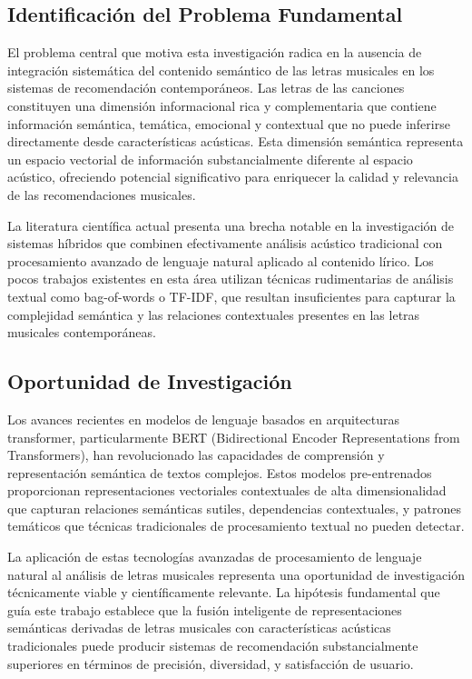 \documentclass[12pt,a4paper]{article}
\begin{document}
\subsection{Identificación del Problema Fundamental}

El problema central que motiva esta investigación radica en la ausencia de integración sistemática del contenido semántico de las letras musicales en los sistemas de recomendación contemporáneos. Las letras de las canciones constituyen una dimensión informacional rica y complementaria que contiene información semántica, temática, emocional y contextual que no puede inferirse directamente desde características acústicas. Esta dimensión semántica representa un espacio vectorial de información substancialmente diferente al espacio acústico, ofreciendo potencial significativo para enriquecer la calidad y relevancia de las recomendaciones musicales.

La literatura científica actual presenta una brecha notable en la investigación de sistemas híbridos que combinen efectivamente análisis acústico tradicional con procesamiento avanzado de lenguaje natural aplicado al contenido lírico. Los pocos trabajos existentes en esta área utilizan técnicas rudimentarias de análisis textual como bag-of-words o TF-IDF, que resultan insuficientes para capturar la complejidad semántica y las relaciones contextuales presentes en las letras musicales contemporáneas.

\subsection{Oportunidad de Investigación}

Los avances recientes en modelos de lenguaje basados en arquitecturas transformer, particularmente BERT (Bidirectional Encoder Representations from Transformers), han revolucionado las capacidades de comprensión y representación semántica de textos complejos. Estos modelos pre-entrenados proporcionan representaciones vectoriales contextuales de alta dimensionalidad que capturan relaciones semánticas sutiles, dependencias contextuales, y patrones temáticos que técnicas tradicionales de procesamiento textual no pueden detectar.

La aplicación de estas tecnologías avanzadas de procesamiento de lenguaje natural al análisis de letras musicales representa una oportunidad de investigación técnicamente viable y científicamente relevante. La hipótesis fundamental que guía este trabajo establece que la fusión inteligente de representaciones semánticas derivadas de letras musicales con características acústicas tradicionales puede producir sistemas de recomendación substancialmente superiores en términos de precisión, diversidad, y satisfacción de usuario.
\end{document}
